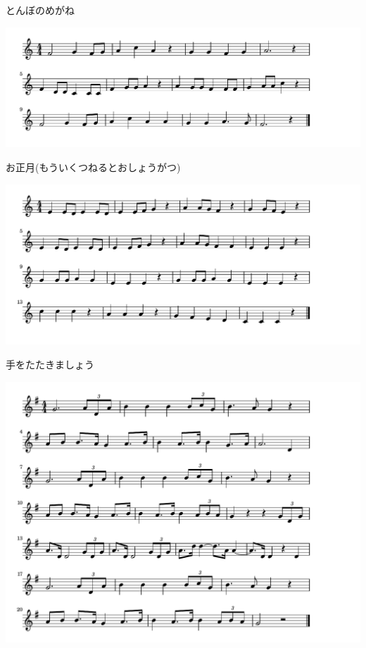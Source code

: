\documentclass[a4paper]{ltjsarticle}
\begin{document}
\vspace{-10mm} \hspace{10mm}
とんぼのめがね

\includegraphics[clip]{oshogatsu_crop.pdf}

\vspace{-10mm} \hspace{10mm}
お正月(もういくつねるとおしょうがつ)

\includegraphics[clip]{tewotata_crop.pdf}

\vspace{-10mm} \hspace{10mm}
手をたたきましょう

\includegraphics[clip]{gaisen_crop.pdf}
\end{document}
